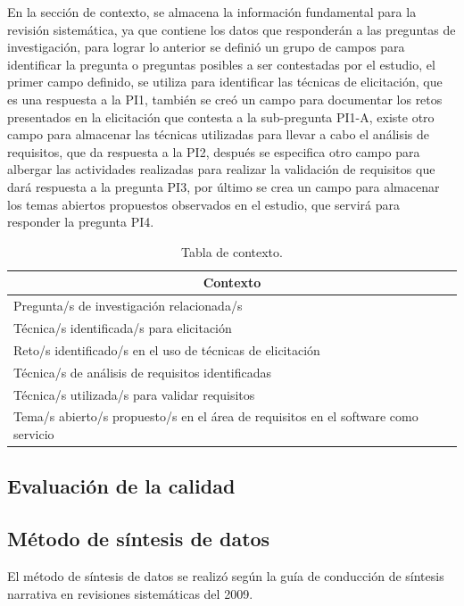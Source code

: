 \documentclass[conference,onecolumn,10pt]{IEEEtran}
\begin{document}
En la sección de contexto, se almacena la información fundamental para la revisión sistemática, ya que contiene los datos que responderán a las
preguntas de investigación, para lograr lo anterior se definió un grupo de campos para identificar la pregunta o preguntas posibles a ser contestadas 
por el estudio, el primer campo definido, se utiliza para identificar las técnicas de elicitación, que es una respuesta a la PI1, también se creó un campo para 
documentar los retos presentados en la elicitación que contesta a la sub-pregunta PI1-A, existe otro campo para almacenar las técnicas utilizadas para llevar a cabo 
el análisis de requisitos, que da respuesta a la PI2, después se especifica otro campo para albergar las actividades realizadas para realizar la validación de requisitos que 
dará respuesta a la pregunta PI3, por último se crea un campo para almacenar los temas abiertos propuestos observados en el estudio, que servirá para responder la pregunta PI4.

\begin{table}
\begin{center}
\caption{Tabla de contexto.}
\begin{tabular}{ |l|l| }
\hline
    \multicolumn{2}{|c|}{Contexto} \\
    \hline
    Pregunta/s de investigación relacionada/s & \\
    \hline
    Técnica/s identificada/s para elicitación& \\
    \hline
    Reto/s identificado/s en el uso de técnicas de elicitación& \\
    \hline
    Técnica/s de análisis de requisitos identificadas& \\
    \hline
    Técnica/s utilizada/s para validar requisitos & \\
    \hline
    Tema/s abierto/s propuesto/s en el área de requisitos en el software como servicio& \\
 \hline
\end{tabular}
\end{center}
\end{table}
\newpage

\subsection{Evaluación de la calidad}
\newpage

\subsection{Método de síntesis de datos}
El método de síntesis de datos se realizó según la guía de conducción de síntesis narrativa en revisiones
sistemáticas del 2009. 
\end{document}

